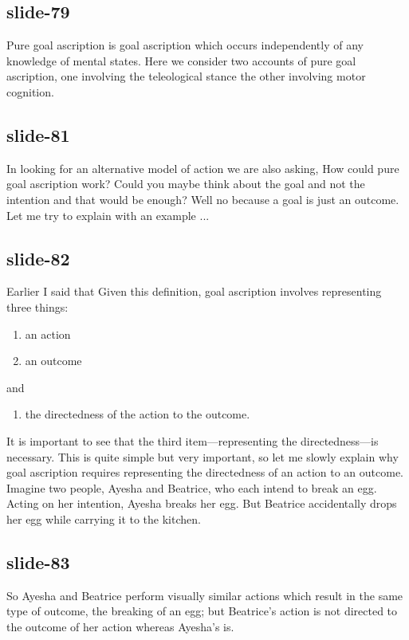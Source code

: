 \documentclass[12pt,\papersize]{extarticle}
\begin{document}
 
\subsection{slide-79}
Pure goal ascription is goal ascription which occurs independently of any knowledge of mental states. Here we consider two accounts of pure goal ascription, one involving the teleological stance the other involving motor cognition.
 
 
\subsection{slide-81}
In looking for an alternative model of action we are also asking, How could pure goal ascription work?
Could you maybe think about the goal and not the intention and that would be enough?
Well no because a goal is just an outcome. Let me try to explain with an example ...
 
 
\subsection{slide-82}
Earlier I said that \dfGoalAscription{}
Given this definition, goal ascription involves representing three things:
\begin{enumerate}
\item an action
\item an outcome
\end{enumerate}
and
\begin{enumerate}[resume]
\item the directedness of the action to the outcome.
\end{enumerate}
 
It is important to see that the third item---representing the directedness---is necessary.
This is quite simple but very important, so let me slowly explain why goal ascription requires representing the directedness of an action to an outcome.
Imagine two people, Ayesha and Beatrice, who each intend to break an egg.
Acting on her intention, Ayesha breaks her egg.
But Beatrice accidentally drops her egg while carrying it to the kitchen.
 
 
\subsection{slide-83}
So Ayesha and Beatrice perform visually similar actions which result in the same type of outcome, the breaking of an egg;
but Beatrice's action is not directed to the outcome of her action whereas Ayesha's is.
 
\end{document}
